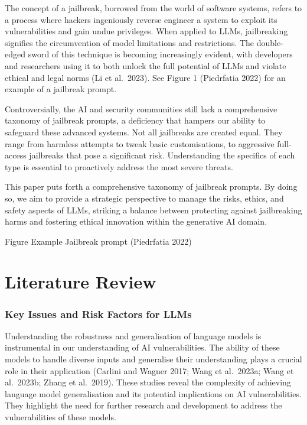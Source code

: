 \documentclass[
  letterpaper,
  DIV=11,
  numbers=noendperiod]{scrartcl}
\begin{document}
The concept of a jailbreak, borrowed from the world of software systems,
refers to a process where hackers ingeniously reverse engineer a system
to exploit its vulnerabilities and gain undue privileges. When applied
to LLMs, jailbreaking signifies the circumvention of model limitations
and restrictions. The double-edged sword of this technique is becoming
increasingly evident, with developers and researchers using it to both
unlock the full potential of LLMs and violate ethical and legal norms
(Li et al.~2023). See Figure 1 (Piedrfatia 2022) for an example of a
jailbreak prompt.

Controversially, the AI and security communities still lack a
comprehensive taxonomy of jailbreak prompts, a deficiency that hampers
our ability to safeguard these advanced systems. Not all jailbreaks are
created equal. They range from harmless attempts to tweak basic
customisations, to aggressive full-access jailbreaks that pose a
significant risk. Understanding the specifics of each type is essential
to proactively address the most severe threats.

This paper puts forth a comprehensive taxonomy of jailbreak prompts. By
doing so, we aim to provide a strategic perspective to manage the risks,
ethics, and safety aspects of LLMs, striking a balance between
protecting against jailbreaking harms and fostering ethical innovation
within the generative AI domain.

Figure Example Jailbreak prompt (Piedrfatia 2022)

\section{Literature Review}\label{literature-review}

\subsubsection{Key Issues and Risk Factors for
LLMs}\label{key-issues-and-risk-factors-for-llms}

Understanding the robustness and generalisation of language models is
instrumental in our understanding of AI vulnerabilities. The ability of
these models to handle diverse inputs and generalise their understanding
plays a crucial role in their application (Carlini and Wagner 2017; Wang
et al.~2023a; Wang et al.~2023b; Zhang et al.~2019). These studies
reveal the complexity of achieving language model generalisation and its
potential implications on AI vulnerabilities. They highlight the need
for further research and development to address the vulnerabilities of
these models.
\end{document}
